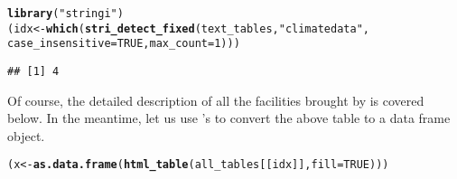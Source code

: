 \documentclass[nojss]{jss}\usepackage[]{graphicx}\usepackage[]{xcolor}
\makeatletter
\newcommand{\hlnum}[1]{\textcolor[rgb]{0.686,0.059,0.569}{#1}}%
\newcommand{\hlstr}[1]{\textcolor[rgb]{0.192,0.494,0.8}{#1}}%
\newcommand{\hlstd}[1]{\textcolor[rgb]{0.345,0.345,0.345}{#1}}%
\newcommand{\hlkwb}[1]{\textcolor[rgb]{0.69,0.353,0.396}{#1}}%
\newcommand{\hlkwc}[1]{\textcolor[rgb]{0.333,0.667,0.333}{#1}}%
\newcommand{\hlkwd}[1]{\textcolor[rgb]{0.737,0.353,0.396}{\textbf{#1}}}%
\newenvironment{kframe}{%
 \def\at@end@of@kframe{}%
 \ifinner\ifhmode%
  \def\at@end@of@kframe{\end{minipage}}%
  \begin{minipage}{\columnwidth}%
 \fi\fi%
 \def\FrameCommand##1{\hskip\@totalleftmargin \hskip-\fboxsep
 \colorbox{shadecolor}{##1}\hskip-\fboxsep
     \hskip-\linewidth \hskip-\@totalleftmargin \hskip\columnwidth}%
 \MakeFramed {\advance\hsize-\width
   \@totalleftmargin\z@ \linewidth\hsize
   \@setminipage}}%
 {\par\unskip\endMakeFramed%
 \at@end@of@kframe}
\newenvironment{knitrout}{}{} %
\makeatother
\begin{document}
\begin{knitrout}
\color{fgcolor}\begin{kframe}
\begin{alltt}
\hlkwd{library}\hlstd{(}\hlstr{"stringi"}\hlstd{)}
\hlstd{(idx} \hlkwb{<-} \hlkwd{which}\hlstd{(}\hlkwd{stri_detect_fixed}\hlstd{(text_tables,} \hlstr{"climate data"}\hlstd{,}
  \hlkwc{case_insensitive}\hlstd{=}\hlnum{TRUE}\hlstd{,} \hlkwc{max_count}\hlstd{=}\hlnum{1}\hlstd{)))}
\end{alltt}
\begin{verbatim}
## [1] 4
\end{verbatim}
\end{kframe}
\end{knitrout}

Of course, the detailed description of all the facilities
brought by  is covered below.
In the meantime, let us use 's 
to convert the above table to a data frame object.


\begin{knitrout}
\color{fgcolor}\begin{kframe}
\begin{alltt}
\hlstd{(x} \hlkwb{<-} \hlkwd{as.data.frame}\hlstd{(}\hlkwd{html_table}\hlstd{(all_tables[[idx]],} \hlkwc{fill}\hlstd{=}\hlnum{TRUE}\hlstd{)))}
\end{alltt}
\end{kframe}
\end{knitrout}
\end{document}
